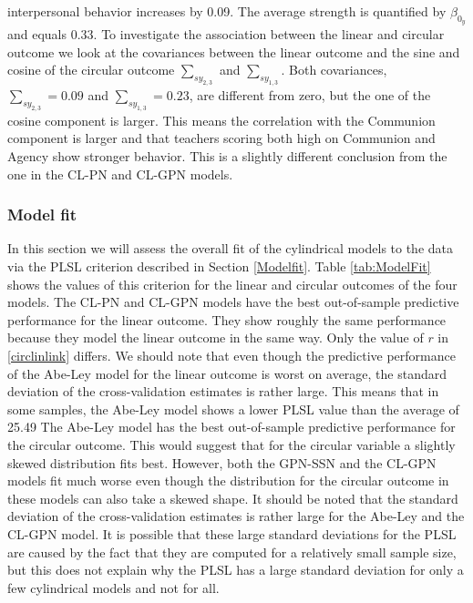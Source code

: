 \documentclass[12pt,]{article}
\begin{document}
interpersonal behavior increases by 0.09. The average strength is
quantified by \(\beta_{0_y}\) and equals 0.33.\newline
\indent To investigate the association between the linear and circular
outcome we look at the covariances between the linear outcome and the
sine and cosine of the circular outcome \(\sum_{sy_{2,3}}\) and
\(\sum_{sy_{1,3}}\). Both covariances, \(\sum_{sy_{2,3}} = 0.09\) and
\(\sum_{sy_{1,3}} = 0.23\), are different from zero, but the one of the
cosine component is larger. This means the correlation with the
Communion component is larger and that teachers scoring both high on
Communion and Agency show stronger behavior. This is a slightly
different conclusion from the one in the CL-PN and CL-GPN models.

\subsubsection{Model fit}

In this section we will assess the overall fit of the cylindrical models
to the data via the PLSL criterion described in Section \ref{Modelfit}.
Table \ref{tab:ModelFit} shows the values of this criterion for the
linear and circular outcomes of the four models.\newline
\indent The CL-PN and CL-GPN models have the best out-of-sample
predictive performance for the linear outcome. They show roughly the
same performance because they model the linear outcome in the same way.
Only the value of \(r\) in \eqref{circlinlink} differs. We should note
that even though the predictive performance of the Abe-Ley model for the
linear outcome is worst on average, the standard deviation of the
cross-validation estimates is rather large. This means that in some
samples, the Abe-Ley model shows a lower PLSL value than the average of
25.49\newline
\indent The Abe-Ley model has the best out-of-sample predictive
performance for the circular outcome. This would suggest that for the
circular variable a slightly skewed distribution fits best. However,
both the GPN-SSN and the CL-GPN models fit much worse even though the
distribution for the circular outcome in these models can also take a
skewed shape. It should be noted that the standard deviation of the
cross-validation estimates is rather large for the Abe-Ley and the
CL-GPN model. It is possible that these large standard deviations for
the PLSL are caused by the fact that they are computed for a relatively
small sample size, but this does not explain why the PLSL has a large
standard deviation for only a few cylindrical models and not for all.
\end{document}
